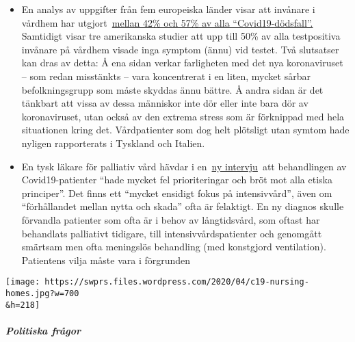 \begin{itemize}
\tightlist
\item
  En analys av uppgifter från fem europeiska länder visar att invånare i
  vårdhem har
  utgjort~\href{https://ltccovid.org/2020/04/12/mortality-associated-with-covid-19-outbreaks-in-care-homes-early-international-evidence/}{mellan
  42\% och 57\% av alla ``Covid19-dödsfall''.} Samtidigt visar tre
  amerikanska studier att upp till 50\% av alla testpositiva invånare på
  vårdhem visade inga symptom (ännu) vid testet. Två slutsatser kan dras
  av detta: Å ena sidan verkar farligheten med det nya koronaviruset --
  som redan misstänkts -- vara koncentrerat i en liten, mycket sårbar
  befolkningsgrupp som måste skyddas ännu bättre. Å andra sidan är det
  tänkbart att vissa av dessa människor inte dör eller inte bara dör av
  koronaviruset, utan också av den extrema stress som är förknippad med
  hela situationen kring det. Vårdpatienter som dog helt plötsligt utan
  symtom hade nyligen rapporterats i Tyskland och Italien.
\item
  En tysk läkare för palliativ vård hävdar i
  en~\href{https://www.deutschlandfunk.de/palliativmediziner-zu-covid-19-behandlungen-sehr-falsche.694.de.html?dram:article_id=474488}{ny
  intervju}~att behandlingen av Covid19-patienter ``hade mycket fel
  prioriteringar och bröt mot alla etiska principer''. Det finns ett
  ``mycket ensidigt fokus på intensivvård'', även om ``förhållandet
  mellan nytta och skada'' ofta är felaktigt. En ny diagnos skulle
  förvandla patienter som ofta är i behov av långtidsvård, som oftast
  har behandlats palliativt tidigare, till intensivvårdspatienter och
  genomgått smärtsam men ofta meningslös behandling (med konstgjord
  ventilation). Patientens vilja måste vara i förgrunden
\end{itemize}

\texttt{[image: https://swprs.files.wordpress.com/2020/04/c19-nursing-homes.jpg?w=700\\\&h=218]}

\hypertarget{politiska-fruxe5gor}{%
\subparagraph{\texorpdfstring{\textbf{Politiska
frågor}}{Politiska frågor}}\label{politiska-fruxe5gor}}

